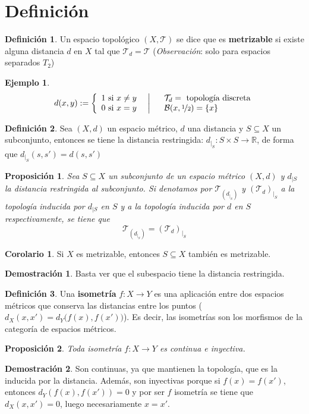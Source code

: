 \documentclass[12pt,twoside]{report}
\newcommand\mc[1]{\mathcal{#1}}
\theoremstyle{azul}
\theoremstyle{azul2}
\theoremstyle{plain}
\newtheorem*{prop}{Proposición}
\theoremstyle{definition}
\newtheorem*{eje}{Ejemplo}
\newtheorem*{defi}{Definición}
\newtheorem*{dem}{Demostración}
\newtheorem*{cor}{Corolario}
\theoremstyle{remark}
\begin{document}
\section{Definición}
\begin{defi}
Un espacio topológico $(X, \mc{T})$ se dice que es \textbf{metrizable} si existe alguna distancia $d$ en $X$ tal que $\mc{T}_d = \mc{T}$ (\textit{Observación}: solo para espacios separados $T_2$)
\end{defi}
\begin{eje}
$$d(x,y):= \left\{ \begin{array}{c}
     1 \text{ si } x \neq y  \\
     0 \text{ si } x=y 
\end{array} \; \; \; \right| \quad \begin{array}{l}
     \mc{T}_d = \text{ topología discreta} \\
     \mathcal{B}(x, \nicefrac{1}{2})= \{ x \} 
\end{array}$$
\end{eje}
\begin{defi}
Sea $(X,d)$ un espacio métrico, $d$ una distancia y $S \subseteq X$ un subconjunto, entonces se tiene la distancia restringida: 
$d_{|_S} : S \times S  \longrightarrow  \mathbb{R}$, de forma que $d_{|_S}(s,s')=d(s,s')$
\end{defi}
\begin{prop}
Sea $S\subseteq X$ un subconjunto de un espacio métrico $(X,d)$ y $d_{|S}$ la distancia restringida al subconjunto. Si denotamos por $\mc{T}_{(d_{|_S})}$ y $(\mc{T}_d)_{|_S}$ a la topología inducida por $d_{|S}$ en $S$ y a la topología inducida por $d$ en $S$ respectivamente, se tiene que 
$$\mc{T}_{(d_{|_S})}=(\mc{T}_d)_{|_S}$$
\end{prop}
\begin{cor}
Si $X$ es metrizable, entonces $S\subseteq X$ también es metrizable.
\end{cor}
\begin{dem}
Basta ver que el subespacio tiene la distancia restringida. 
\end{dem}
\begin{defi} Una \textbf{isometría} $f:X\longrightarrow Y$ es una aplicación entre dos espacios métricos que conserva las distancias entre los puntos \big($d_X(x,x')=d_Y\big(f(x), f(x')\big)$\big). Es decir, las isometrías son los morfismos de la categoría de espacios métricos. 
\end{defi}\begin{prop}
Toda isometría $f:X\longrightarrow Y$ es continua e inyectiva.
\end{prop}
\begin{dem}
Son continuas, ya que mantienen la topología, que es la inducida por la distancia. Además, son inyectivas porque si $f(x)=f(x')$, entonces  $d_Y(f(x),f(x'))=0$ y por ser $f$ isometría se tiene que $d_X(x,x')=0$, luego necesariamente $x=x'$.
\end{dem}
\end{document}
